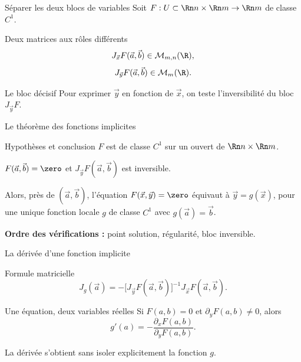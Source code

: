 \begin{frame}[t]{Séparer les deux blocs de variables}
\coursanalyse
Soit $F:U\subset\Rn n\times\Rn m\to\Rn m$ de classe $C^1$.
\begin{cours}{Deux matrices aux rôles différents}
\[J_{\vec x}F(\vec a,\vec b)\in\mathcal M_{m,n}(\R),\]
\[J_{\vec y}F(\vec a,\vec b)\in\mathcal M_{m}(\R).\]
\end{cours}
\begin{resultat}{Le bloc décisif}
Pour exprimer $\vec y$ en fonction de $\vec x$, on teste l’inversibilité du bloc $J_{\vec y}F$.
\end{resultat}
\end{frame}

\begin{frame}[t]{Le théorème des fonctions implicites}
\coursanalyse
\begin{theoreme}{Hypothèses et conclusion}
$F$ est de classe $C^1$ sur un ouvert de $\Rn n\times\Rn m$.
\medskip\par $F(\vec a,\vec b)=\zero$ et $J_{\vec y}F(\vec a,\vec b)$ est inversible.
\medskip\par Alors, près de $(\vec a,\vec b)$, l’équation $F(\vec x,\vec y)=\zero$ équivaut à $\vec y=g(\vec x)$, pour une unique fonction locale $g$ de classe $C^1$ avec $g(\vec a)=\vec b$.
\end{theoreme}
\vfill\textbf{Ordre des vérifications :} point solution, régularité, bloc inversible.
\end{frame}

\begin{frame}[t]{La dérivée d’une fonction implicite}
\coursanalyse
\begin{resultat}{Formule matricielle}
\[J_g(\vec a)=-\bigl[J_{\vec y}F(\vec a,\vec b)\bigr]^{-1}J_{\vec x}F(\vec a,\vec b).\]
\end{resultat}
\begin{exemple}{Une équation, deux variables réelles}
Si $F(a,b)=0$ et $\partial_yF(a,b)\ne0$, alors
\[g'(a)=-\frac{\partial_xF(a,b)}{\partial_yF(a,b)}.\]
\end{exemple}\vfill La dérivée s’obtient sans isoler explicitement la fonction $g$.
\end{frame}

